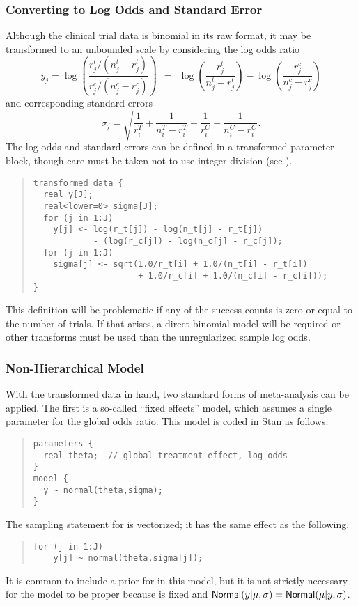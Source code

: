 \subsubsection{Converting to Log Odds and Standard Error}

Although the clinical trial data is binomial in its raw format, it may
be transformed to an unbounded scale by considering the log odds ratio
\[
y_j = \log \left( \frac{r^t_j / (n^t_j - r^t_j)}
                       {r^c_j / (n^c_j - r^c_j)} \right)
\ \ = \ \ 
\log \left( \frac{r^t_j}{n^t_j - r^t_j} \right)
- 
\log \left( \frac{r^c_j}{n^c_j - r^c_j} \right)
\]
and corresponding standard errors
\[
\sigma_j = \sqrt{
\frac{1}{r^T_i} 
+ \frac{1}{n^T_i - r^T_i}
+ \frac{1}{r^C_i} 
+ \frac{1}{n^C_i - r^C_i}
}.
\]
%
The log odds and standard errors can be defined in a
transformed parameter block, though care must be taken not to use
integer division (see \refsection{int-arithmetic}).
%
\begin{quote}
\begin{Verbatim}[fontsize=\small]
transformed data {
  real y[J];
  real<lower=0> sigma[J];
  for (j in 1:J) 
    y[j] <- log(r_t[j]) - log(n_t[j] - r_t[j])
            - (log(r_c[j]) - log(n_c[j] - r_c[j]);
  for (j in 1:J)
    sigma[j] <- sqrt(1.0/r_t[i] + 1.0/(n_t[i] - r_t[i])
                     + 1.0/r_c[i] + 1.0/(n_c[i] - r_c[i]));
}
\end{Verbatim}
\end{quote}
%
This definition will be problematic if any of the success counts is 
zero or equal to the number of trials.
If that arises, a direct binomial model will be required or other
transforms must be used than the unregularized sample log odds.

\subsubsection{Non-Hierarchical Model}

With the transformed data in hand, two standard forms of meta-analysis
can be applied.  The first is a so-called ``fixed effects'' model,
which assumes a single parameter for the global odds ratio.  This
model is coded in Stan as follows.
%
\begin{quote}
\begin{Verbatim}[fontsize=\small]
parameters {
  real theta;  // global treatment effect, log odds
}
model {
  y ~ normal(theta,sigma);
}
\end{Verbatim}
\end{quote}
%
The sampling statement for  is vectorized; it has the same
effect as the following.
\begin{quote}
\begin{Verbatim}[fontsize=\small]
  for (j in 1:J)
    y[j] ~ normal(theta,sigma[j]);
\end{Verbatim}
\end{quote}
%
It is common to include a prior for  in this model, but it
is not strictly necessary for the model to be proper because \code{y}
is fixed and $\mbox{\sf Normal}(y|\mu,\sigma) =
\mbox{\sf Normal}(\mu|y,\sigma)$.

